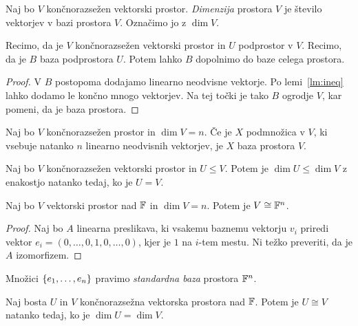 \documentclass[12pt, a4paper]{article}
\begin{document}
\begin{definicija}
Naj bo $V$ končnorazsežen vektorski prostor. \emph{Dimenzija} prostora $V$ je število vektorjev v bazi prostora $V$. Označimo jo z $\dim V$.
\end{definicija}

\begin{trditev}
Recimo, da je $V$ končnorazsežen vektorski prostor in $U$ podprostor v $V$. Recimo, da je $B$ baza podprostora $U$. Potem lahko $B$ dopolnimo do baze celega prostora.
\end{trditev}

\begin{proof}
V $B$ postopoma dodajamo linearno neodvisne vektorje. Po lemi~\ref{lm:ineq} lahko dodamo le končno mnogo vektorjev. Na tej točki je tako $B$ ogrodje $V$, kar pomeni, da je baza prostora.
\end{proof}

\begin{posledica}
Naj bo $V$ končnorazsežen prostor in $\dim V=n$. Če je $X$ podmnožica v $V$, ki vsebuje natanko $n$ linearno neodvisnih vektorjev, je $X$ baza prostora $V$.
\end{posledica}

\begin{posledica}
Naj bo $V$ končnorazsežen vektorski prostor in $U\leq V$. Potem je $\dim U\leq\dim V$ z enakostjo natanko tedaj, ko je $U=V$.
\end{posledica}

\begin{izrek}
Naj bo $V$ vektorski prostor nad $\mathbb{F}$ in $\dim V=n$. Potem je $V\cong\mathbb{F}^n$.
\end{izrek}

\begin{proof}
Naj bo $A$ linearna preslikava, ki vsakemu baznemu vektorju $v_i$ priredi vektor $e_i=(0,\dots,0,1,0,\dots,0)$, kjer je $1$ na $i$-tem mestu. Ni težko preveriti, da je $A$ izomorfizem.
\end{proof}

\begin{opomba}
Množici $\left\{e_1,\dots,e_n\right\}$ pravimo \emph{standardna baza} prostora $\mathbb{F}^n$.
\end{opomba}

\begin{izrek}
Naj bosta $U$ in $V$ končnorazsežna vektorska prostora nad $\mathbb{F}$. Potem je $U\cong V$ natanko tedaj, ko je $\dim U=\dim V$.
\end{izrek}
\end{document}
